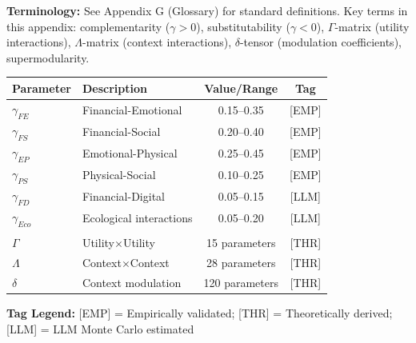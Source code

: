 
\begin{tcolorbox}[colback=gray!5!white, colframe=gray!50!black]
\textbf{Terminology:} See Appendix G (Glossary) for standard definitions.
Key terms in this appendix: complementarity ($\gamma > 0$), substitutability ($\gamma < 0$),
$\Gamma$-matrix (utility interactions), $\Lambda$-matrix (context interactions),
$\delta$-tensor (modulation coefficients), supermodularity.
\end{tcolorbox}

\begin{tcolorbox}[colback=blue!5!white, colframe=blue!75!black,
    title=\textbf{Epistemic Status: Key Parameters}]

\renewcommand{\arraystretch}{1.3}
\begin{tabular}{@{}llcc@{}}
\toprule
\textbf{Parameter} & \textbf{Description} & \textbf{Value/Range} & \textbf{Tag} \\
\midrule
$\gamma_{FE}$ & Financial-Emotional & 0.15--0.35 & [EMP] \\
$\gamma_{FS}$ & Financial-Social & 0.20--0.40 & [EMP] \\
$\gamma_{EP}$ & Emotional-Physical & 0.25--0.45 & [EMP] \\
$\gamma_{PS}$ & Physical-Social & 0.10--0.25 & [EMP] \\
$\gamma_{FD}$ & Financial-Digital & 0.05--0.15 & [LLM] \\
$\gamma_{Eco}$ & Ecological interactions & 0.05--0.20 & [LLM] \\
\addlinespace
\multicolumn{4}{@{}l}{\textit{Matrix dimensions:}} \\
$\Gamma$ & Utility$\times$Utility & 15 parameters & [THR] \\
$\Lambda$ & Context$\times$Context & 28 parameters & [THR] \\
$\delta$ & Context modulation & 120 parameters & [THR] \\
\bottomrule
\end{tabular}

\vspace{0.5em}
\textbf{Tag Legend:} [EMP] = Empirically validated; [THR] = Theoretically derived;
[LLM] = LLM Monte Carlo estimated

\end{tcolorbox}

